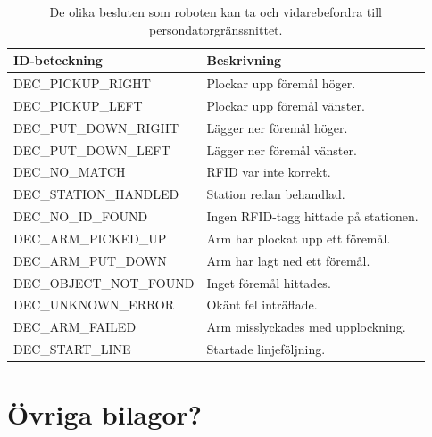 \begin{table}[H]
\label{decision}
\begin{tabularx}{\textwidth}{|l|X|}
\hline
\textbf{ID-beteckning} & \textbf{Beskrivning} \\ \hline
DEC\_PICKUP\_RIGHT & Plockar upp föremål höger. \\ \hline
DEC\_PICKUP\_LEFT & Plockar upp föremål vänster. \\ \hline
DEC\_PUT\_DOWN\_RIGHT & Lägger ner föremål höger. \\ \hline
DEC\_PUT\_DOWN\_LEFT & Lägger ner föremål vänster.  \\ \hline
DEC\_NO\_MATCH & RFID var inte korrekt.  \\ \hline
DEC\_STATION\_HANDLED & Station redan behandlad.  \\ \hline
DEC\_NO\_ID\_FOUND & Ingen RFID-tagg hittade på stationen.  \\ \hline
DEC\_ARM\_PICKED\_UP & Arm har plockat upp ett föremål. \\ \hline
DEC\_ARM\_PUT\_DOWN & Arm har lagt ned ett föremål. \\ \hline
DEC\_OBJECT\_NOT\_FOUND & Inget föremål hittades. \\ \hline
DEC\_UNKNOWN\_ERROR & Okänt fel inträffade. \\ \hline
DEC\_ARM\_FAILED & Arm misslyckades med upplockning. \\ \hline
DEC\_START\_LINE & Startade linjeföljning. \\ \hline
\end{tabularx}
\caption{De olika besluten som roboten kan ta och vidarebefordra till persondatorgränssnittet.}
\end{table}

\section{Övriga bilagor?}
